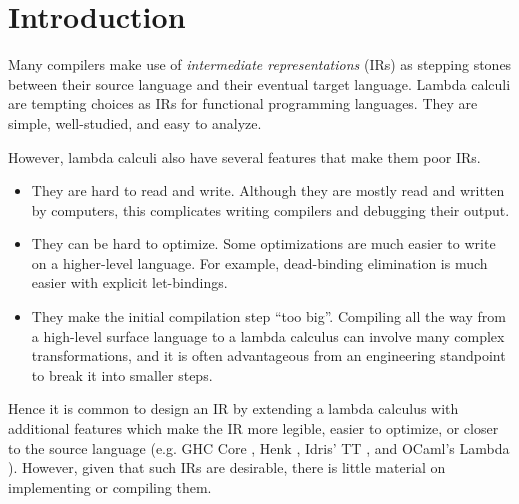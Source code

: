 \maketitle

\begin{abstract}
Lambda calculi are often used as intermediate representations for
compilers. However, they require extensions to handle higher-level
features of programming languages. In this paper we show how to
construct an IR based on \FOMF{} which supports recursive functions
and datatypes, and describe how to compile it to \FOMF{}.  Our IR was
developed for commercial use at the IOHK company, where it is used as
part of a compilation pipeline for smart contracts running on a
blockchain.
\end{abstract}

\section{Introduction}

Many compilers make use of \emph{intermediate representations} (IRs) as stepping
stones between their source language and their eventual target language. Lambda
calculi are tempting choices as IRs for functional programming languages. They
are simple, well-studied, and easy to analyze.

However, lambda calculi also have several features that make them poor IRs.
\begin{itemize}
  \item They are hard to read and write. Although they are mostly read and
    written by computers, this complicates writing compilers and
    debugging their output.
  \item They can be hard to optimize. Some optimizations are much easier to
    write on a higher-level language. For example, dead-binding elimination is
    much easier with explicit let-bindings.
  \item They make the initial compilation step ``too big''. Compiling all the way
    from a high-level surface language to a lambda calculus can involve many
    complex transformations, and it is often advantageous from an engineering
    standpoint to break it into smaller steps.
\end{itemize}

Hence it is common to design an IR by extending a lambda calculus with
additional features which make the IR more legible, easier to optimize, or
closer to the source language (e.g. GHC Core \cite{jones1998transformation}, Henk \cite{Henk}, Idris' TT
\cite{brady2013idris}, and OCaml's Lambda \cite{leroy1990zinc}). However, given that such IRs are desirable,
there is little material on implementing or compiling them.

